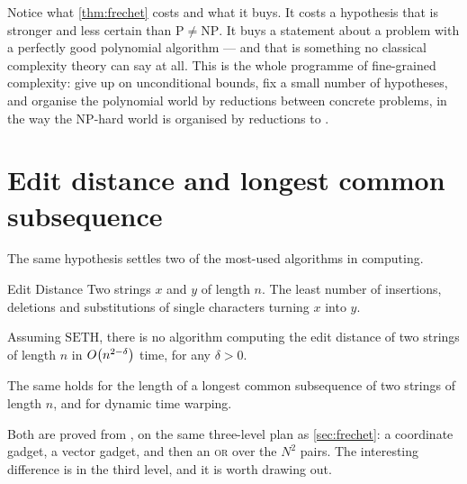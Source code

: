 \begin{intuition}
Notice what \cref{thm:frechet} costs and what it buys. It costs a hypothesis
that is stronger and less certain than $\mathrm{P} \ne \mathrm{NP}$. It buys a
statement about a problem with a perfectly good polynomial algorithm --- and
that is something no classical complexity theory can say at all. This is the
whole programme of fine-grained complexity: give up on unconditional bounds,
fix a small number of hypotheses, and organise the polynomial world by
reductions between concrete problems, in the way the \textrm{NP}-hard world is
organised by reductions to .
\end{intuition}

\section{Edit distance and longest common subsequence}
\label{sec:edit-distance}

The same hypothesis settles two of the most-used algorithms in computing.

\begin{probdef}{Edit Distance}
  \instance Two strings $x$ and $y$ of length $n$.
  \question The least number of insertions, deletions and substitutions of
  single characters turning $x$ into $y$.
\end{probdef}

\begin{theorem}\label{thm:edit-distance}
Assuming $\mathrm{SETH}$, there is no algorithm computing the edit distance of
two strings of length $n$ in $O\!\left(n^{2-\delta}\right)$ time, for any $\delta > 0$.
\end{theorem}

\begin{theorem}\label{thm:lcs}
The same holds for the length of a longest common subsequence of two strings of
length $n$, and for dynamic time warping.
\end{theorem}

Both are proved from , on the same three-level plan as
\cref{sec:frechet}: a coordinate gadget, a vector gadget, and then an
\textsc{or} over the $N^2$ pairs. The interesting difference is in the third
level, and it is worth drawing out.

